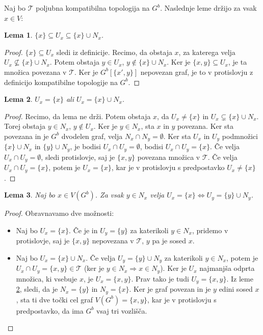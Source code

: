 \documentclass[a4paper, 12pt]{book}
\newtheorem{lemma}{Lema}[section]
\theoremstyle{definition}
\theoremstyle{remark}
\begin{document}
Naj bo $\mathcal{T}$ poljubna kompatibilna topologija na $G^b$. Naslednje leme držijo za vsak $x \in V$:
\begin{lemma}\label{lem1}
  $\{x\} \subseteq U_x \subseteq \{x\} \cup N_x$.
\end{lemma}
\begin{proof}
  $\{x\} \subseteq U_x$ sledi iz definicije. Recimo, da obstaja $x$, za katerega velja
  $U_{x} \nsubseteq \{x\} \cup N_{x}$. Potem obstaja
  $y \in U_{x}$, $y \notin \{x\} \cup N_{x}$. Ker je $\{x, y\} \subseteq U_x$,
  je ta množica povezana v $\mathcal{T}$. Ker je $G^b[\{x',y\}]$ nepovezan graf, je to v
  protislovju z definicijo kompatibilne topologije na $G^b$.
\end{proof}
\begin{lemma}\label{lem2}
  $U_x = \{x\}$ ali $U_x = \{x\} \cup N_x$.
\end{lemma}
\begin{proof}
  Recimo, da lema ne drži. Potem obstaja $x$, da $U_{x} \neq \{x\}$ in
  $U_{x} \subsetneq \{x\} \cup N_{x}$. Torej obstaja $y \in N_{x}$, $y \notin U_{x}$.
  Ker je $y \in N_{x}$, sta $x$ in $y$ povezana. Ker sta povezana in je $G^b$
  dvodelen graf, velja $N_{x} \cap N_y = \emptyset$. Ker sta $U_{x}$ in $U_y$ 
  podmnožici $\{x\} \cup N_x$ in $\{y\} \cup N_y$, je bodisi $U_{x} \cap U_y = \emptyset$,
  bodisi $U_{x} \cap U_y = \{x\}$. Če velja $U_{x} \cap U_y = \emptyset$, sledi
  protislovje, saj je $\{x,y\}$ povezana množica v $\mathcal{T}$.
  Če velja $U_{x} \cap U_y = \{x\}$, potem je $U_{x} = \{x\}$, kar je v
  protislovju s predpostavko $U_{x} \neq \{x\}$.
\end{proof}
\begin{lemma}\label{lem3}
  Naj bo $x \in V(G^b)$. Za vsak $y \in N_x$ velja $U_x = \{x\} \iff U_y = \{y\} \cup N_y$.
\end{lemma}
\begin{proof}
  Obravnavamo dve možnosti:
  \begin{itemize}
    \item[(1)] Naj bo $U_x = \{x\}$. Če je in $U_y = \{y\}$ za katerikoli $y \in N_x$, pridemo v protislovje, saj je 
    $\{x,y\}$ nepovezana v $\mathcal{T}$, $y$ pa je sosed $x$.
    \item[(2)] Naj bo $U_x = \{x\} \cup N_x$. Če velja $U_y = \{y\} \cup N_y$ za katerikoli $y \in N_x$, potem je
    $U_x \cap U_y = \{x, y\} \in \mathcal{T}$ (ker je $y \in N_x \Rightarrow x \in N_y$). Ker je
    $U_x$ najmanjša odprta množica, ki vsebuje $x$, je $U_x = \{x,y\}$. Prav tako je
    tudi $U_y = \{x,y\}$. Iz leme \ref*{lem2}, sledi, da je $N_x = \{y\}$ in $N_y = \{x\}$.
    Ker je graf povezan in je $y$ edini sosed $x$, sta ti dve točki cel graf
    $V(G^b) = \{x,y\}$, kar je v protislovju s predpostavko, da ima $G^b$ vsaj tri vozlišča.
  \end{itemize}
\end{proof}
\end{document}
